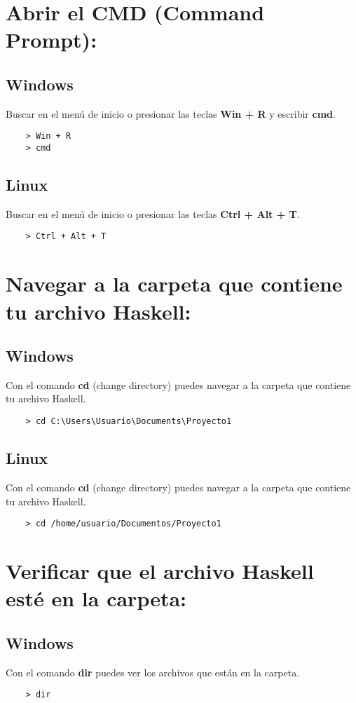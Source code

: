 \documentclass{article}
\begin{document}
\section{Abrir el CMD (Command Prompt):}
\subsection{Windows}
Buscar en el menú de inicio o presionar las teclas \textbf{Win + R} y escribir \textbf{cmd}.
\begin{verbatim}
    > Win + R
    > cmd
\end{verbatim}
\subsection{Linux}
Buscar en el menú de inicio o presionar las teclas \textbf{Ctrl + Alt + T}.
\begin{verbatim}
    > Ctrl + Alt + T
\end{verbatim}

\section{Navegar a la carpeta que contiene tu archivo Haskell:}
\subsection{Windows}
Con el comando \textbf{cd} (change directory) puedes navegar a la carpeta que contiene tu archivo Haskell.
\begin{verbatim}
    > cd C:\Users\Usuario\Documents\Proyecto1
\end{verbatim}
\subsection{Linux}
Con el comando \textbf{cd} (change directory) puedes navegar a la carpeta que contiene tu archivo Haskell.
\begin{verbatim}
    > cd /home/usuario/Documentos/Proyecto1
\end{verbatim}

\section{Verificar que el archivo Haskell esté en la carpeta:}
\subsection{Windows}
Con el comando \textbf{dir} puedes ver los archivos que están en la carpeta.
\begin{verbatim}
    > dir
\end{verbatim}
\end{document}

